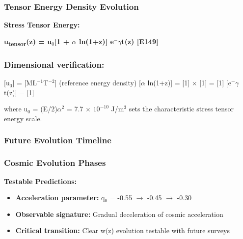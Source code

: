 \documentclass[11pt,a4paper]{article}
\begin{document}
\subsubsection{Tensor Energy Density Evolution}
\textbf{Stress Tensor Energy:}

\textbf{u\textsubscript{tensor}(z) = u$_{0}$[1 + $\alpha$ ln(1+z)] e$^{-}$$\gamma$t(z) [E149]}

\begin{mdframed}[linecolor=accent,linewidth=0.5pt,backgroundcolor=callout-bg,leftline=true,rightline=true,topline=true,bottomline=true,innerleftmargin=8pt,innerrightmargin=8pt,innertopmargin=6pt,innerbottommargin=6pt]
\subsubsection{Dimensional verification:}
[u$_{0}$] = [ML$^{-1}$T$^{-2}$] (reference energy density)\newline{}
[$\alpha$ ln(1+z)] = [1] $\times$ [1] = [1] \checkmark{}\newline{}
[e$^{-}$$\gamma$t(z)] = [1] \checkmark{}
\end{mdframed}

where u$_{0}$ = (E/\allowbreak{}2)$\alpha$$^{2}$ = 7.7 $\times$ $10^{-10}$ J/\allowbreak{}m$^{3}$ sets the characteristic stress tensor energy scale.

\subsubsection{Future Evolution Timeline}
\begin{mdframed}[linecolor=accent,linewidth=0.5pt,backgroundcolor=callout-bg,leftline=true,rightline=true,topline=true,bottomline=true,innerleftmargin=8pt,innerrightmargin=8pt,innertopmargin=6pt,innerbottommargin=6pt]
\subsubsection{Cosmic Evolution Phases}
\end{mdframed}

\textbf{Testable Predictions:}

\begin{itemize}
  \item \textbf{Acceleration parameter:} q$_{0}$ = -0.55 $\rightarrow$ -0.45 $\rightarrow$ -0.30
  \item \textbf{Observable signature:} Gradual deceleration of cosmic acceleration
  \item \textbf{Critical transition:} Clear w(z) evolution testable with future surveys
\end{itemize}
\end{document}
